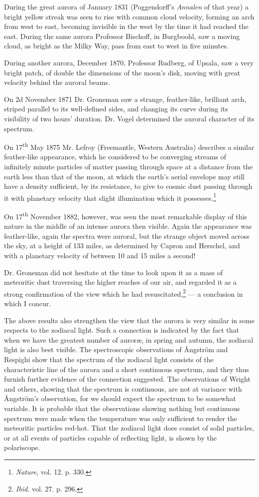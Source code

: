 \documentclass[a4paper, 12pt, oneside, polutonikogreek, english]{article}
\begin{document}
During the great aurora of January 1831 (Poggendorff's \emph{Annalen} of that year) a bright yellow streak was seen to rise with common cloud velocity, forming an arch from west to east, becoming invisible in the west by the time it had reached the east. During the same aurora Professor Bischoff, in Burgboohl, saw a moving cloud, as bright as the Milky Way, pass from east to west in five minutes.

During another aurora, December 1870, Professor Rudberg, of Upsala, saw a very bright patch, of double the dimensions of the moon's disk, moving with great velocity behind the auroral beams.

On 2d November 1871 Dr. Groneman saw a strange, feather-like, brilliant arch, striped parallel to its well-defined sides, and changing its curve during its visibility of two hours' duration. Dr. Vogel determined the auroral character of its spectrum.

On 17\textsuperscript{th} May 1875 Mr. Lefroy (Freemantle, Western Australia) describes a similar feather-like appearance, which he considered to be converging streams of infinitely minute particles of matter passing through space at a distance from the earth less than that of the moon, at which the earth's aerial envelope may still have a density sufficient, by its resistance, to give to cosmic dust passing through it with planetary velocity that slight illumination which it possesses.\footnote{\emph{Nature}, vol. 12. p. 330.}

On 17\textsuperscript{th} November 1882, however, was seen the most remarkable display of this nature in the middle of an intense aurora then visible. Again the appearance was feather-like, again the spectra were auroral, but the strange object moved across the sky, at a height of 133 miles, as determined by Capron and Herschel, and with a planetary velocity of between 10 and 15 miles a second!

Dr. Groneman did not hesitate at the time to look upon it as a mass of meteoritic dust traversing the higher reaches of our air, and regarded it as a strong confirmation of the view which he had resuscitated,\footnote{\emph{Ibid.} vol. 27. p. 296.} --- a conclusion in which I concur.

The above results also strengthen the view that the aurora is very similar in some respects to the zodiacal light. Such a connection is indicated by the fact that when we have the greatest number of auroræ, in spring and autumn, the zodiacal light is also best visible. The spectroscopic observations of Ångström and Respighi show that the spectrum of the zodiacal light consists of the characteristic line of the aurora and a short continuous spectrum, and they thus furnish further evidence of the connection suggested. The observations of Wright and others, showing that the spectrum is continuous, are not at variance with Ångström's observation, for we should expect the spectrum to be somewhat variable. It is probable that the observations showing nothing but continuous spectrum were made when the temperature was only sufficient to render the meteoritic particles red-hot. That the zodiacal light does consist of solid particles, or at all events of particles capable of reflecting light, is shown by the polariscope.
\end{document}
